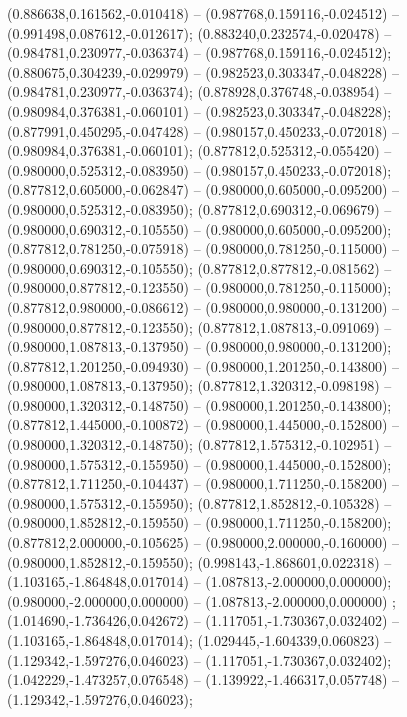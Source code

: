 (0.886638,0.161562,-0.010418) -- (0.987768,0.159116,-0.024512) -- (0.991498,0.087612,-0.012617);
 (0.883240,0.232574,-0.020478) -- (0.984781,0.230977,-0.036374) -- (0.987768,0.159116,-0.024512);
 (0.880675,0.304239,-0.029979) -- (0.982523,0.303347,-0.048228) -- (0.984781,0.230977,-0.036374);
 (0.878928,0.376748,-0.038954) -- (0.980984,0.376381,-0.060101) -- (0.982523,0.303347,-0.048228);
 (0.877991,0.450295,-0.047428) -- (0.980157,0.450233,-0.072018) -- (0.980984,0.376381,-0.060101);
 (0.877812,0.525312,-0.055420) -- (0.980000,0.525312,-0.083950) -- (0.980157,0.450233,-0.072018);
 (0.877812,0.605000,-0.062847) -- (0.980000,0.605000,-0.095200) -- (0.980000,0.525312,-0.083950);
 (0.877812,0.690312,-0.069679) -- (0.980000,0.690312,-0.105550) -- (0.980000,0.605000,-0.095200);
 (0.877812,0.781250,-0.075918) -- (0.980000,0.781250,-0.115000) -- (0.980000,0.690312,-0.105550);
 (0.877812,0.877812,-0.081562) -- (0.980000,0.877812,-0.123550) -- (0.980000,0.781250,-0.115000);
 (0.877812,0.980000,-0.086612) -- (0.980000,0.980000,-0.131200) -- (0.980000,0.877812,-0.123550);
 (0.877812,1.087813,-0.091069) -- (0.980000,1.087813,-0.137950) -- (0.980000,0.980000,-0.131200);
 (0.877812,1.201250,-0.094930) -- (0.980000,1.201250,-0.143800) -- (0.980000,1.087813,-0.137950);
 (0.877812,1.320312,-0.098198) -- (0.980000,1.320312,-0.148750) -- (0.980000,1.201250,-0.143800);
 (0.877812,1.445000,-0.100872) -- (0.980000,1.445000,-0.152800) -- (0.980000,1.320312,-0.148750);
 (0.877812,1.575312,-0.102951) -- (0.980000,1.575312,-0.155950) -- (0.980000,1.445000,-0.152800);
 (0.877812,1.711250,-0.104437) -- (0.980000,1.711250,-0.158200) -- (0.980000,1.575312,-0.155950);
 (0.877812,1.852812,-0.105328) -- (0.980000,1.852812,-0.159550) -- (0.980000,1.711250,-0.158200);
 (0.877812,2.000000,-0.105625) -- (0.980000,2.000000,-0.160000) -- (0.980000,1.852812,-0.159550);
 (0.998143,-1.868601,0.022318) -- (1.103165,-1.864848,0.017014) -- (1.087813,-2.000000,0.000000);
 (0.980000,-2.000000,0.000000) -- (1.087813,-2.000000,0.000000) ;
 (1.014690,-1.736426,0.042672) -- (1.117051,-1.730367,0.032402) -- (1.103165,-1.864848,0.017014);
 (1.029445,-1.604339,0.060823) -- (1.129342,-1.597276,0.046023) -- (1.117051,-1.730367,0.032402);
 (1.042229,-1.473257,0.076548) -- (1.139922,-1.466317,0.057748) -- (1.129342,-1.597276,0.046023);
